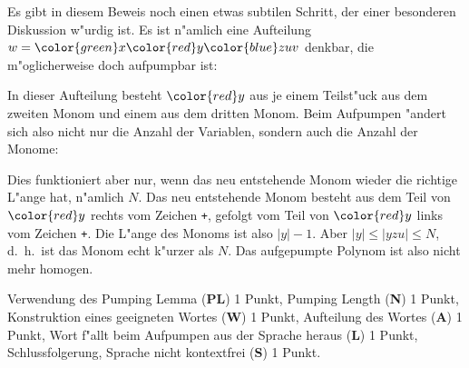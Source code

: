 \begin{diskussion}
Es gibt in diesem Beweis noch einen etwas subtilen Schritt, der einer
besonderen Diskussion w"urdig ist. Es ist n"amlich eine Aufteilung
$w={\color{green}x}{\color{red}y}{\color{blue}z}uv$ denkbar, die m"oglicherweise doch aufpumpbar ist:
\begin{center}
\end{center}
In dieser Aufteilung besteht $\color{red}y$ aus je einem Teilst"uck
aus dem zweiten Monom und einem aus dem dritten Monom. Beim
Aufpumpen "andert sich also nicht nur die Anzahl der
Variablen, sondern auch die Anzahl der Monome:
\begin{center}
\end{center}
Dies funktioniert
aber nur, wenn das neu entstehende Monom wieder die richtige
L"ange hat, n"amlich $N$. Das neu entstehende Monom besteht
aus dem Teil von $\color{red}y$ rechts vom Zeichen \texttt{+},
gefolgt vom Teil von $\color{red}y$ links vom Zeichen \texttt{+}.
Die L"ange des Monoms ist also $|y|-1$. Aber $|y|\le |yzu|\le N$,
d.~h.~ist das Monom echt k"urzer als $N$. Das aufgepumpte Polynom ist
also nicht mehr homogen.
\end{diskussion}

\begin{bewertung}
Verwendung des Pumping Lemma ({\bf PL}) 1 Punkt,
Pumping Length ({\bf N}) 1 Punkt,
Konstruktion eines geeigneten Wortes ({\bf W}) 1 Punkt,
Aufteilung des Wortes ({\bf A}) 1 Punkt,
Wort f"allt beim Aufpumpen aus der Sprache heraus ({\bf L}) 1 Punkt,
Schlussfolgerung, Sprache nicht kontextfrei ({\bf S}) 1 Punkt.
\end{bewertung}

